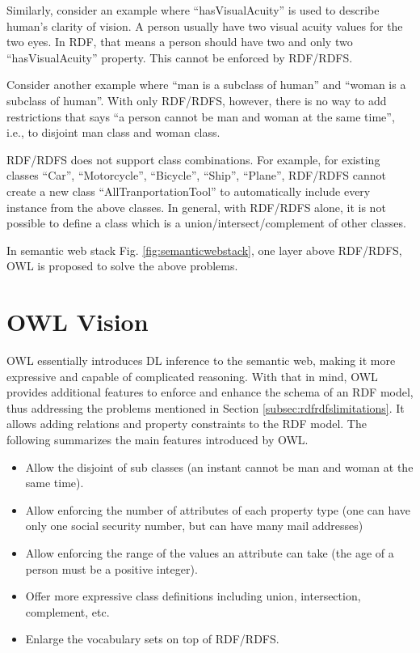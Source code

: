Similarly, consider an example where ``hasVisualAcuity'' is used to describe human's clarity of vision. A person usually have two visual acuity values for the two eyes. In RDF, that means a person should have two and only two ``hasVisualAcuity'' property. This cannot be enforced by RDF/RDFS.

Consider another example where ``man is a subclass of human'' and ``woman is a subclass of human''. With only RDF/RDFS, however, there is no way to add restrictions that says ``a person cannot be man and woman at the same time'', i.e., to disjoint man class and woman class.

RDF/RDFS does not support class combinations. For example, for existing classes ``Car'', ``Motorcycle'', ``Bicycle'', ``Ship'', ``Plane'', RDF/RDFS cannot create a new class ``AllTranportationTool'' to automatically include every instance from the above classes. In general, with RDF/RDFS alone, it is not possible to define a class which is a union/intersect/complement of other classes.

In semantic web stack Fig. \ref{fig:semanticwebstack}, one layer above RDF/RDFS, OWL is proposed to solve the above problems.

\section{OWL Vision}

OWL essentially introduces DL inference to the semantic web, making it more expressive and capable of complicated reasoning. With that in mind, OWL provides additional features to enforce and enhance the schema of an RDF model, thus addressing the problems mentioned in Section \ref{subsec:rdfrdfslimitations}. It allows adding relations and property constraints to the RDF model. The following summarizes the main features introduced by OWL.
\begin{itemize}
	\item Allow the disjoint of sub classes (an instant cannot be man and woman at the same time).
	\item Allow enforcing the number of attributes of each property type (one can have only one social security number, but can have many mail addresses)
	\item Allow enforcing the range of the values an attribute can take (the age of a person must be a positive integer).
	\item Offer more expressive class definitions including union, intersection, complement, etc.
	\item Enlarge the vocabulary sets on top of RDF/RDFS.
\end{itemize}

